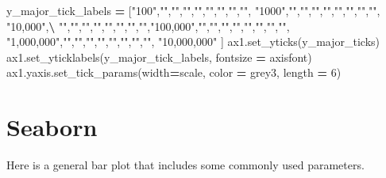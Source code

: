\documentclass[]{book}
\newenvironment{Shaded}{\begin{snugshade}}{\end{snugshade}}
\newcommand{\DecValTok}[1]{\textcolor[rgb]{0.00,0.00,0.81}{#1}}
\newcommand{\NormalTok}[1]{#1}
\newcommand{\OperatorTok}[1]{\textcolor[rgb]{0.81,0.36,0.00}{\textbf{#1}}}
\newcommand{\StringTok}[1]{\textcolor[rgb]{0.31,0.60,0.02}{#1}}
\begin{document}
\begin{Shaded}
\begin{Highlighting}[]
\NormalTok{y_major_tick_labels }\OperatorTok{=}\NormalTok{ [}\StringTok{"100"}\NormalTok{,}\StringTok{""}\NormalTok{,}\StringTok{""}\NormalTok{,}\StringTok{""}\NormalTok{,}\StringTok{""}\NormalTok{,}\StringTok{""}\NormalTok{,}\StringTok{""}\NormalTok{,}\StringTok{""}\NormalTok{,}\StringTok{""}\NormalTok{, }\StringTok{"1000"}\NormalTok{,}\StringTok{""}\NormalTok{,}\StringTok{""}\NormalTok{,}\StringTok{""}\NormalTok{,}\StringTok{""}\NormalTok{,}\StringTok{""}\NormalTok{,}\StringTok{""}\NormalTok{,}\StringTok{""}\NormalTok{,}\StringTok{""}\NormalTok{, }\StringTok{"10,000"}\NormalTok{,}\OperatorTok{\textbackslash{}}
                       \StringTok{""}\NormalTok{,}\StringTok{""}\NormalTok{,}\StringTok{""}\NormalTok{,}\StringTok{""}\NormalTok{,}\StringTok{""}\NormalTok{,}\StringTok{""}\NormalTok{,}\StringTok{""}\NormalTok{,}\StringTok{""}\NormalTok{,}\StringTok{"100,000"}\NormalTok{,}\StringTok{""}\NormalTok{,}\StringTok{""}\NormalTok{,}\StringTok{""}\NormalTok{,}\StringTok{""}\NormalTok{,}\StringTok{""}\NormalTok{,}\StringTok{""}\NormalTok{,}\StringTok{""}\NormalTok{,}\StringTok{""}\NormalTok{, }\StringTok{"1,000,000"}\NormalTok{,}\StringTok{""}\NormalTok{,}\StringTok{""}\NormalTok{,}\StringTok{""}\NormalTok{,}\StringTok{""}\NormalTok{,}\StringTok{""}\NormalTok{,}\StringTok{""}\NormalTok{,}\StringTok{""}\NormalTok{,}\StringTok{""}\NormalTok{, }\StringTok{"10,000,000"}\NormalTok{ ]}
\NormalTok{ax1.set_yticks(y_major_ticks)}
\NormalTok{ax1.set_yticklabels(y_major_tick_labels, fontsize }\OperatorTok{=}\NormalTok{ axisfont)}
\NormalTok{ax1.yaxis.set_tick_params(width}\OperatorTok{=}\NormalTok{scale, color }\OperatorTok{=}\NormalTok{ grey3, length }\OperatorTok{=} \DecValTok{6}\NormalTok{)}
\end{Highlighting}
\end{Shaded}

\hypertarget{seaborn}{%
\section{Seaborn}\label{seaborn}}

Here is a general bar plot that includes some commonly used parameters.
\end{document}
